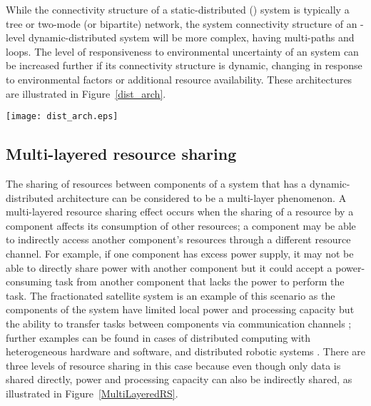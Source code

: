 \documentclass[journal,onecolumn]{IEEEtran}
\theoremstyle{plain}
\begin{document}
While the connectivity structure of a static-distributed () system is typically a tree or two-mode (or bipartite) network, the system connectivity structure of an -level dynamic-distributed system will be more complex, having multi-paths and loops. The level of responsiveness to environmental uncertainty of an  system can be increased further if its connectivity structure is dynamic, changing in response to environmental factors or additional resource availability. These architectures are illustrated in Figure~\ref{dist_arch}.

\begin{figure*}[!t]
\centering
\texttt{[image: dist\_arch.eps]}
\caption{Connectivity structure of distributed systems with different levels of flexibility (solid lines represent static connections and dotted lines represent dynamic connections; nodes with solid colors denote fixed roles (client/server) and nodes with gradient color denote components with dynamic roles) (a) Resource allocation and the design of the connectivity structure are centralized (). (b) Resource sharing is decentralized but the connectivity structure is static and designed centrally (). (c) Resource sharing is decentralized and connectivity structure is dynamic and formed by distributed components (). }
\label{dist_arch}
\end{figure*}



\subsection{Multi-layered resource sharing}
The sharing of resources between components of a system that has a dynamic-distributed architecture can be considered to be a multi-layer phenomenon. A multi-layered resource sharing effect occurs when the sharing of a resource by a component affects its consumption of other resources; a component may be able to indirectly access another component's resources through a different resource channel. For example, if one component has excess power supply, it may not be able to directly share power with another component but it could accept a power-consuming task from another component that lacks the power to perform the task. The fractionated satellite system is an example of this scenario as the components of the system have limited local power and processing capacity but the ability to transfer tasks between components via communication channels \citep{brown2009value, mosleh2014optimal}; further examples can be found in cases of distributed computing with heterogeneous hardware and software, and distributed robotic systems \citep{roberts1970computer, wang1994resource}. There are three levels of resource sharing in this case because even though  only data is shared directly, power and processing capacity can also be indirectly shared, as illustrated in Figure~\ref{MultiLayeredRS}. 
\end{document}
